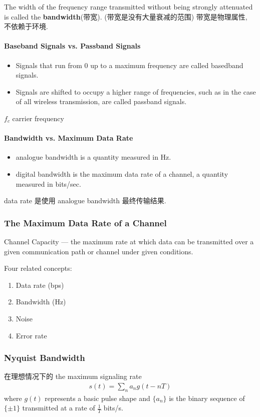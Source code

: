 The width of the frequency range transmitted without being strongly attenuated is called the \textbf{bandwidth}(带宽). (带宽是没有大量衰减的范围) 带宽是物理属性, 不依赖于环境. 

\paragraph{Baseband Signals vs. Passband Signals}\quad
\begin{itemize}
    \item Signals that run from 0 up to a maximum frequency are called basedband signals.
    \item Signals are shifted to occupy a higher range of frequencies, such as in the case of all wireless transmission, are called passband signals.
\end{itemize}

$f_c$ carrier frequency

\paragraph{Bandwidth vs. Maximum Data Rate}
\begin{itemize}
    \item analogue bandwidth is a quantity measured in Hz.
    \item digital bandwidth is the maximum data rate of a channel, a quantity measured in bits/sec.
\end{itemize}
data rate 是使用 analogue bandwidth 最终传输结果. 


\subsubsection{The Maximum Data Rate of a Channel}
Channel Capacity --- the maximum rate at which data can be transmitted over a given communication path or channel under given conditions.

Four related concepts:
\begin{enumerate}\small
    \item Data rate (bps)
    \item Bandwidth (Hz)
    \item Noise
    \item Error rate
\end{enumerate}

\subsubsection{Nyquist Bandwidth}
在理想情况下的 the maximum signaling rate
\begin{align*}
    s(t)=\sum_n a_n g(t-nT)
\end{align*}
where $g(t)$ represents a basic pulse shape and $\{a_n\}$ is the binary sequence of $\{\pm 1\}$ transmitted at a rate of $\frac{1}{T}$ bits/s.

